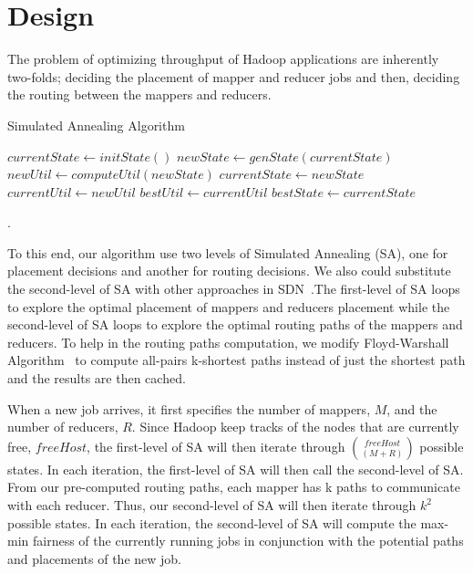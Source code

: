 \section{Design}


The problem of optimizing throughput of Hadoop applications are inherently two-folds;
deciding the placement of mapper and reducer jobs and then, deciding the routing
between the mappers and reducers.

\begin{algorithm}
    \caption{Simulated Annealing Algorithm}
    \label{alg:1}
    \begin{algorithmic}[1]
        \State $currentState \gets initState()$
                \State $newState \gets genState(currentState)$
                \State $newUtil \gets computeUtil(newState)$
                \State
                    \State $currentState \gets newState$
                    \State $currentUtil \gets newUtil$
                \EndIf
                \State
                    \State $bestUtil \gets currentUtil$
                    \State $bestState \gets currentState$
                \EndIf
            \EndFor
            \State {}
    \end{algorithmic}
\end{algorithm}

.

To this end, our algorithm use two levels of Simulated Annealing (SA), one for
placement decisions and another for routing decisions. We also could substitute
the second-level of SA with other approaches in SDN~\cite{flowcomb13}.The
first-level of SA loops to explore the optimal placement of mappers and
reducers placement while the second-level of SA loops to explore the optimal
routing paths of the mappers and reducers. To help in the routing paths
computation, we modify Floyd-Warshall Algorithm~\cite{FloydWarshall13} to
compute all-pairs k-shortest paths instead of just the shortest path and
the results are then cached.

When a new job arrives, it first specifies the number of mappers, $M$, and the
number of reducers, $R$. Since Hadoop keep tracks of the nodes that are
currently free, $freeHost$, the first-level of SA will then iterate through
$freeHost \choose (M+R)$ possible states. In each iteration, the first-level of
SA will then call the second-level of SA. From our pre-computed routing paths,
each mapper has k paths to communicate with each reducer. Thus, our
second-level of SA will then iterate through $k^{2}$ possible states. In
each iteration, the second-level of SA will compute the max-min fairness
of the currently running jobs in conjunction with the potential paths and placements
of the new job.
